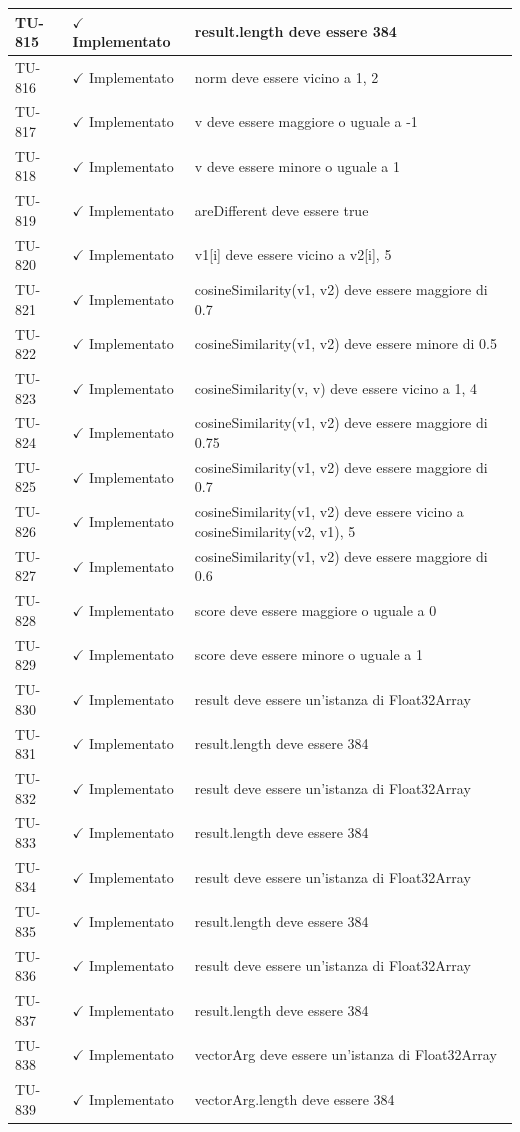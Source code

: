 ﻿\documentclass[a4paper,12pt]{article}
\newcommand{\ok}{\textcolor{green!60!black}{$\checkmark$ Implementato}}
\begin{document}
\begin{longtable}{|p{2cm}|p{3.5cm}|p{9.5cm}|}
\hline
TU-815 & \ok & result.length deve essere 384 \\
\hline
TU-816 & \ok & norm deve essere vicino a 1, 2 \\
\hline
TU-817 & \ok & v deve essere maggiore o uguale a -1 \\
\hline
TU-818 & \ok & v deve essere minore o uguale a 1 \\
\hline
TU-819 & \ok & areDifferent deve essere true \\
\hline
TU-820 & \ok & v1[i] deve essere vicino a v2[i], 5 \\
\hline
TU-821 & \ok & cosineSimilarity(v1, v2) deve essere maggiore di 0.7 \\
\hline
TU-822 & \ok & cosineSimilarity(v1, v2) deve essere minore di 0.5 \\
\hline
TU-823 & \ok & cosineSimilarity(v, v) deve essere vicino a 1, 4 \\
\hline
TU-824 & \ok & cosineSimilarity(v1, v2) deve essere maggiore di 0.75 \\
\hline
TU-825 & \ok & cosineSimilarity(v1, v2) deve essere maggiore di 0.7 \\
\hline
TU-826 & \ok & cosineSimilarity(v1, v2) deve essere vicino a cosineSimilarity(v2, v1), 5 \\
\hline
TU-827 & \ok & cosineSimilarity(v1, v2) deve essere maggiore di 0.6 \\
\hline
TU-828 & \ok & score deve essere maggiore o uguale a 0 \\
\hline
TU-829 & \ok & score deve essere minore o uguale a 1 \\
\hline
TU-830 & \ok & result deve essere un'istanza di Float32Array \\
\hline
TU-831 & \ok & result.length deve essere 384 \\
\hline
TU-832 & \ok & result deve essere un'istanza di Float32Array \\
\hline
TU-833 & \ok & result.length deve essere 384 \\
\hline
TU-834 & \ok & result deve essere un'istanza di Float32Array \\
\hline
TU-835 & \ok & result.length deve essere 384 \\
\hline
TU-836 & \ok & result deve essere un'istanza di Float32Array \\
\hline
TU-837 & \ok & result.length deve essere 384 \\
\hline
TU-838 & \ok & vectorArg deve essere un'istanza di Float32Array \\
\hline
TU-839 & \ok & vectorArg.length deve essere 384 \\

\end{longtable}
\end{document}
